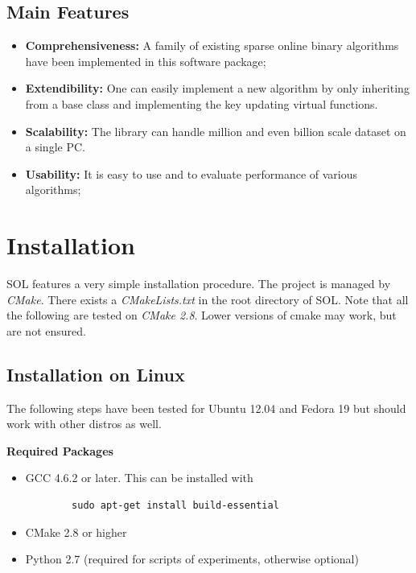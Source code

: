 \documentclass[11pt,a4paper]{article}
\newlength{\wideitemsep}
\let\olditem\item
\renewcommand{\item}{\setlength{\itemsep}{\wideitemsep}\olditem}
\begin{document}
\subsection{Main Features}
\begin{itemize}
    \item \textbf{Comprehensiveness:}
        A family of existing sparse online binary algorithms have been implemented in this software package;
    \item \textbf{Extendibility:}
        One can easily implement a new algorithm by only inheriting from a base
        class and implementing the key updating virtual functions.
    \item \textbf{Scalability:}
        The library can handle million and even billion scale dataset on a
        single PC.
    \item \textbf{Usability:} It is easy to use and to evaluate performance of various algorithms;
\end{itemize}



\section{Installation}
SOL features a very simple installation procedure. The project is managed by
\emph{CMake}. There exists a \emph{CMakeLists.txt} in the root directory of
SOL. Note that all the following are tested on \emph{CMake 2.8}. Lower versions
of cmake may work, but are not ensured. 

\subsection{Installation on Linux}
The following steps have been tested for Ubuntu 12.04 and Fedora 19 but should
work with other distros as well.

\vspace{2mm}\hspace{-5mm}\textbf{Required Packages}

\begin{itemize}[leftmargin=1cm]
    \item GCC 4.6.2 or later. This can be installed with 
        \lstset{language=bash,
        }
        \begin{lstlisting}
        sudo apt-get install build-essential
        \end{lstlisting}
    \item CMake 2.8 or higher
    \item Python 2.7 (required for scripts of experiments, otherwise optional)
\end{itemize}
\end{document}
